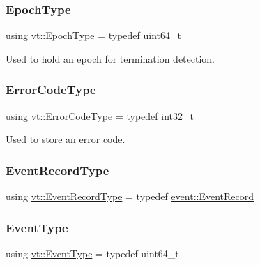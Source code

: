 \subsubsection{\texorpdfstring{Epoch\+Type}{EpochType}}
{\footnotesize\ttfamily using \hyperlink{namespacevt_a985a5adf291c34a3ca263b3378388236}{vt\+::\+Epoch\+Type} = typedef uint64\+\_\+t}



Used to hold an epoch for termination detection. 

\mbox{\label{namespacevt_a793764d753923abc3d32929870beb485}} 
\subsubsection{\texorpdfstring{Error\+Code\+Type}{ErrorCodeType}}
{\footnotesize\ttfamily using \hyperlink{namespacevt_a793764d753923abc3d32929870beb485}{vt\+::\+Error\+Code\+Type} = typedef int32\+\_\+t}



Used to store an error code. 

\mbox{\label{namespacevt_a2dc2f149222f88a250ec9a13db36865d}} 
\subsubsection{\texorpdfstring{Event\+Record\+Type}{EventRecordType}}
{\footnotesize\ttfamily using \hyperlink{namespacevt_a2dc2f149222f88a250ec9a13db36865d}{vt\+::\+Event\+Record\+Type} = typedef \hyperlink{structvt_1_1event_1_1_event_record}{event\+::\+Event\+Record}}

\mbox{\label{namespacevt_a009267401def7ae8bf201892222d060f}} 
\subsubsection{\texorpdfstring{Event\+Type}{EventType}}
{\footnotesize\ttfamily using \hyperlink{namespacevt_a009267401def7ae8bf201892222d060f}{vt\+::\+Event\+Type} = typedef uint64\+\_\+t}




